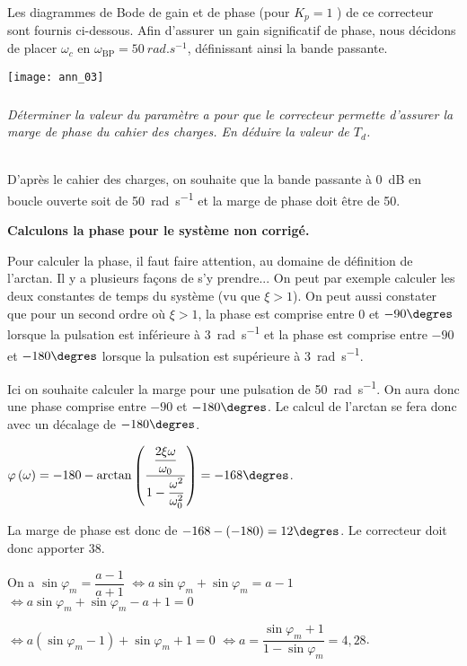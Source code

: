 \begin{multicols}{2}
\ifprof
\else
Les diagrammes de Bode de gain et de phase (pour $K_p=1$ ) de ce correcteur sont fournis ci-dessous. Afin
d'assurer un gain significatif de phase, nous décidons de placer $\omega_c$ en $\omega_{\text{BP}}=\SI{50}{rad.s^{-1}}$, définissant ainsi la bande passante.

\begin{center}
\texttt{[image: ann\_03]}
\end{center}

\fi

\subparagraph{} \textit{Déterminer la valeur du paramètre a pour que le correcteur permette d'assurer la marge de phase
du cahier des charges. En déduire la valeur de $T_d$.}
\ifprof
\begin{corrige} ~\\

D'après le cahier des charges, on souhaite que la bande passante à \SI{0}{dB} en boucle ouverte soit de \SI{50}{rad.s^{-1}} et la marge de phase doit être de 50\degres.

\textbf{Calculons la phase pour le système non corrigé.}

Pour calculer la phase, il faut faire attention, au domaine de définition de l'arctan. Il y a plusieurs façons de s'y prendre...
On peut par exemple calculer les deux constantes de temps du système (vu que $\xi>1$). On peut aussi constater que pour un second ordre où $\xi>1$, la phase est comprise entre 0 et $-90\degres$ lorsque la pulsation est inférieure à \SI{3}{rad.s^{-1}} et la phase est comprise entre $-90$ et $-180\degres$ lorsque la pulsation est supérieure à \SI{3}{rad.s^{-1}}. 

Ici on souhaite calculer la marge pour une pulsation de \SI{50}{rad.s^{-1}}. On aura donc une phase comprise entre $-90$ et $-180\degres$. Le calcul de l'arctan se fera donc avec un décalage de $-180\degres$. 



$\varphi\left(\omega\right)=-180- \arctan\left( \dfrac{\dfrac{2 \xi \omega}{\omega_0}}{1-\dfrac{\omega^2}{\omega_0^2}}\right)=-168\degres $.

La marge de phase est donc de $-168-(-180) = 12\degres$. Le correcteur doit donc apporter 38\degres. 

On a $\sin\varphi_m = \dfrac{a-1}{a+1}$ $\Leftrightarrow a \sin\varphi_m + \sin\varphi_m = a- 1 $
$\Leftrightarrow a \sin\varphi_m + \sin\varphi_m -a+1 = 0 $

$\Leftrightarrow a \left( \sin\varphi_m -1\right)+ \sin\varphi_m +1 = 0 $
$\Leftrightarrow a   = \dfrac{\sin\varphi_m +1}{1-\sin\varphi_m} =4,28$.


\end{corrige}
\end{multicols}
